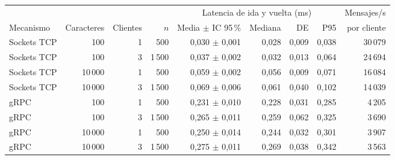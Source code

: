 \begin{tabular}{lrrrrrrrr}
\toprule
 & & & & \multicolumn{4}{c}{Latencia de ida y vuelta (ms)} & Mensajes/s \\
\cmidrule(lr){5-8}
Mecanismo & Caracteres & Clientes & $n$ & Media $\pm$ IC 95\,\% & Mediana & DE & P95 & por cliente \\
\midrule
Sockets TCP & 100 & 1 & 500 & 0,030 $\pm$ 0,001 & 0,028 & 0,009 & 0,038 & 30\,079 \\
Sockets TCP & 100 & 3 & 1\,500 & 0,037 $\pm$ 0,002 & 0,032 & 0,013 & 0,064 & 24\,694 \\
Sockets TCP & 10\,000 & 1 & 500 & 0,059 $\pm$ 0,002 & 0,056 & 0,009 & 0,071 & 16\,084 \\
Sockets TCP & 10\,000 & 3 & 1\,500 & 0,069 $\pm$ 0,006 & 0,061 & 0,040 & 0,102 & 14\,039 \\
\addlinespace
gRPC & 100 & 1 & 500 & 0,231 $\pm$ 0,010 & 0,228 & 0,031 & 0,285 & 4\,205 \\
gRPC & 100 & 3 & 1\,500 & 0,265 $\pm$ 0,011 & 0,259 & 0,062 & 0,325 & 3\,690 \\
gRPC & 10\,000 & 1 & 500 & 0,250 $\pm$ 0,014 & 0,244 & 0,032 & 0,301 & 3\,907 \\
gRPC & 10\,000 & 3 & 1\,500 & 0,275 $\pm$ 0,011 & 0,269 & 0,038 & 0,342 & 3\,563 \\
\bottomrule
\end{tabular}
